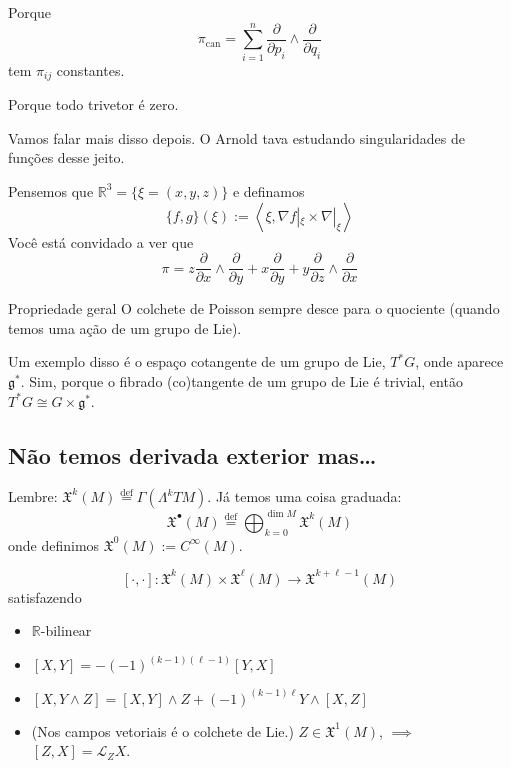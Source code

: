 \begin{example}\leavevmode
Porque
\[\pi_{\operatorname{can}}=\sum_{i=1}^n \frac{\partial }{\partial p_i}\wedge \frac{\partial }{\partial q_i}\]
tem \(\pi_{ij}\) constantes.
\end{example}

\begin{example}\leavevmode
Porque todo trivetor é zero.
\end{example}

\begin{example}\leavevmode
Vamos falar mais disso depois. O Arnold tava estudando singularidades de funções desse jeito.
\end{example}

\begin{example}[\(\mathbb{R}^3\)]\leavevmode
Pensemos que \(\mathbb{R}^3=\{\xi=(x,y,z)\}\) e definamos
\[\{f,g\}(\xi):= \left<\xi,\nabla f|_{\xi}\times \nabla |_{\xi}\right>\]
{\color{2}Você está convidado a ver que}
\[\pi=z \frac{\partial }{\partial x}\wedge\frac{\partial }{\partial y}+x \frac{\partial }{\partial y}+ y \frac{\partial }{\partial z}\wedge\frac{\partial }{\partial x}\]
\end{example}

\begin{thing7}{Propriedade geral}\leavevmode
O colchete de Poisson sempre desce para o quociente (quando temos uma ação de um grupo de Lie).

Um exemplo disso é o espaço cotangente de um grupo de Lie, \(T^* G\), onde aparece \(\mathfrak{g}^*\). Sim, porque o fibrado (co)tangente de um grupo de Lie é trivial, então \(T^*G \cong G\times \mathfrak{g}^*\).
\end{thing7}

\subsection{Não temos derivada exterior mas…}
Lembre: \(\mathfrak{X}^k(M)\overset{\operatorname{def}}{=}\Gamma(\Lambda^{k}TM)\). Já temos uma coisa graduada:
\[\mathfrak{X}^\bullet(M)\overset{\operatorname{def}}{=}\bigoplus_{k=0}^{\dim M}\mathfrak{X}^k(M)\]
onde definimos \(\mathfrak{X}^0(M):= C^\infty(M)\).

\begin{defn}\leavevmode
	\[[\cdot,\cdot]:\mathfrak{X}^k(M) \times \mathfrak{X}^\ell(M) \longrightarrow \mathfrak{X}^{k+ \ell-1}(M)\]
satisfazendo
\begin{itemize}
\item \(\mathbb{R}\)-bilinear
\item \([X,Y]=-(-1)^{(k-1)(\ell-1)}[Y,X]\)
\item \([X,Y \wedge Z]=[X,Y]\wedge Z + (-1)^{(k-1)\ell}Y \wedge[X,Z]\)
\item (Nos campos vetoriais é o colchete de Lie.) \(Z \in \mathfrak{X}^1(M)\), \(\implies\) \([Z,X]=\mathcal{L}_ZX\).
\end{itemize}
\end{defn}

